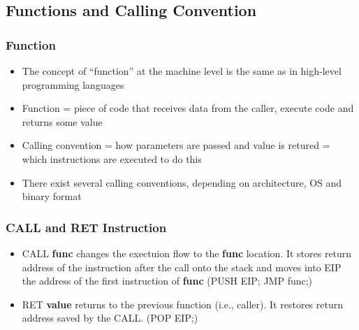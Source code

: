 \documentclass[]{beamer}
\begin{document}
\subsection{Functions and Calling Convention}
\begin{frame}
  \frametitle{Function}
  \begin{itemize}
  \item{The concept of ``function'' at the machine level is the same as in high-level programming languages}
  \item{Function = piece of code that receives data from the caller, execute code and returns some value}
  \item{Calling convention = how parameters are passed and value is retured = which instructions are executed to do this}
  \item{There exist several calling conventions, depending on architecture, OS and binary format}
  \end{itemize}
\end{frame}

\begin{frame}
  \frametitle{CALL and RET Instruction}
  \begin{itemize}
  \item{CALL {\bf func} changes the exectuion flow to the {\bf func} location. It stores return address of the instruction after the call onto the stack and moves into EIP the address of the first instruction of {\bf func}} (PUSH EIP; JMP func;)
  \item{RET {\bf value} returns to the previous function (i.e., caller). It restores return address saved by the CALL.} (POP EIP;)
  \end{itemize}
\end{frame}
\end{document}
